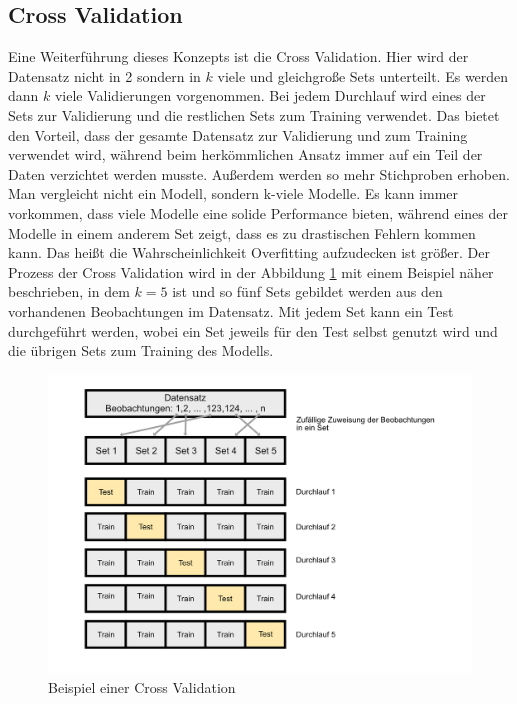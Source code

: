 \documentclass[a4paper,12pt]{thesis}
\begin{document}
\subsection{Cross Validation}

Eine Weiterführung dieses Konzepts ist die Cross Validation. Hier wird der Datensatz nicht in 2 sondern in $k$ viele und gleichgroße Sets unterteilt. Es werden dann $k$ viele Validierungen vorgenommen. Bei jedem Durchlauf wird eines der Sets zur Validierung und die restlichen Sets zum Training verwendet. Das bietet den Vorteil, dass der gesamte Datensatz zur Validierung und zum Training verwendet wird, während beim herkömmlichen Ansatz immer auf ein Teil der Daten verzichtet werden musste. Außerdem werden so mehr Stichproben erhoben. Man vergleicht nicht ein Modell, sondern k-viele Modelle. Es kann immer vorkommen, dass viele Modelle eine solide Performance bieten, während eines der Modelle in einem anderem Set zeigt, dass es zu drastischen Fehlern kommen kann. Das heißt die Wahrscheinlichkeit Overfitting aufzudecken ist größer. Der Prozess der Cross Validation wird in der Abbildung \ref{CV1} mit einem Beispiel näher beschrieben, in dem $k=5$ ist und so fünf Sets gebildet werden aus den vorhandenen Beobachtungen im Datensatz. Mit jedem Set kann ein Test durchgeführt werden, wobei ein Set jeweils für den Test selbst genutzt wird und die übrigen Sets zum Training des Modells.

\begin{figure}[!ht]
	\centering
	\includegraphics[width=14cm]{Plots/CrossValidationBild.png}
	\caption{Beispiel einer Cross Validation}
	\label{CV1}
\end{figure}
\end{document}
